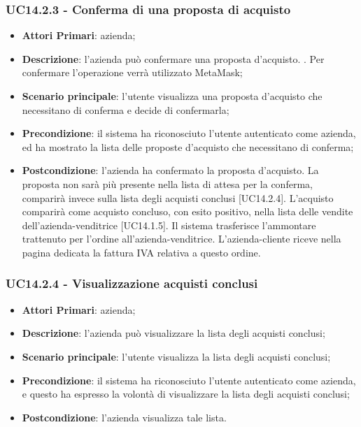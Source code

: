 \subsubsection{UC14.2.3 - Conferma di una proposta di acquisto}
\begin{itemize}
	\item \textbf{Attori Primari}: azienda;
	\item \textbf{Descrizione}: l'azienda può confermare una proposta d'acquisto. . Per confermare l'operazione verrà utilizzato MetaMask\glo;
	\item \textbf{Scenario principale}: l'utente visualizza una proposta d'acquisto che necessitano di conferma e decide di confermarla;
	\item \textbf{Precondizione}: il sistema ha riconosciuto l'utente autenticato come azienda, ed ha mostrato la lista delle proposte d'acquisto che necessitano di conferma;
	\item \textbf{Postcondizione}: l'azienda ha confermato la proposta d'acquisto. La proposta non sarà più presente nella lista di attesa per la conferma, comparirà invece sulla lista degli acquisti conclusi [UC14.2.4]. L'acquisto comparirà come acquisto concluso, con esito positivo, nella lista delle vendite dell'azienda-venditrice [UC14.1.5]. Il sistema trasferisce l'ammontare trattenuto per l'ordine all'azienda-venditrice. L'azienda-cliente riceve nella pagina dedicata la fattura IVA relativa a questo ordine.
\end{itemize}
\subsubsection{UC14.2.4 - Visualizzazione acquisti conclusi}
\begin{itemize}
	\item \textbf{Attori Primari}: azienda;
	\item \textbf{Descrizione}: l'azienda può visualizzare la lista degli acquisti conclusi;
	\item \textbf{Scenario principale}: l'utente visualizza la lista degli acquisti conclusi;
	\item \textbf{Precondizione}: il sistema ha riconosciuto l'utente autenticato come azienda, e questo ha espresso la volontà di visualizzare la lista degli acquisti conclusi;
	\item \textbf{Postcondizione}: l'azienda visualizza tale lista.
\end{itemize}
